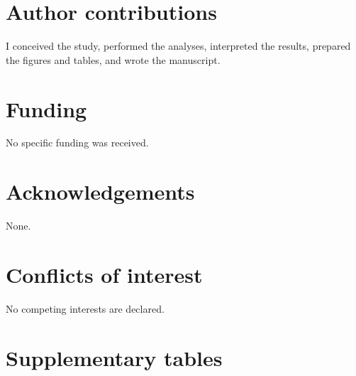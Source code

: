 \documentclass[11pt]{article}
\begin{document}
\section*{Author contributions}

I conceived the study, performed the analyses, interpreted the results, prepared the figures and tables, and wrote the manuscript.

\section*{Funding}

No specific funding was received.

\section*{Acknowledgements}

None.

\section*{Conflicts of interest}

No competing interests are declared.

\bigskip
\section*{Supplementary tables}
\setcounter{table}{0}
\renewcommand{\thetable}{S\arabic{table}}
\captionsetup[table]{name=Supplementary Table}
\end{document}
